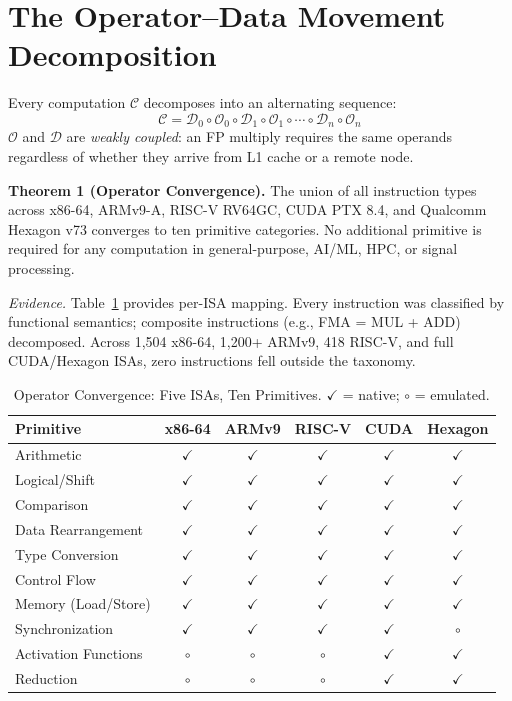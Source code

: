 ﻿\documentclass[review,3p,twocolumn]{elsarticle}
\begin{document}
\section{The Operator--Data Movement Decomposition}
\label{sec:decomp}

Every computation $\mathcal{C}$ decomposes into an alternating sequence:
\begin{equation}
\mathcal{C} = \mathcal{D}_0 \circ \mathcal{O}_0 \circ \mathcal{D}_1 \circ \mathcal{O}_1 \circ \cdots \circ \mathcal{D}_n \circ \mathcal{O}_n
\label{eq:decomp}
\end{equation}
$\mathcal{O}$ and $\mathcal{D}$ are \emph{weakly coupled}: an FP multiply requires the same operands regardless of whether they arrive from L1 cache or a remote node.

\textbf{Theorem 1 (Operator Convergence).} The union of all instruction types across x86-64, ARMv9-A, RISC-V RV64GC, CUDA PTX 8.4, and Qualcomm Hexagon v73 converges to ten primitive categories. No additional primitive is required for any computation in general-purpose, AI/ML, HPC, or signal processing.

\textit{Evidence.} Table~\ref{tab:ops} provides per-ISA mapping. Every instruction was classified by functional semantics; composite instructions (e.g., FMA = MUL + ADD) decomposed. Across 1,504 x86-64, 1,200+ ARMv9, 418 RISC-V, and full CUDA/Hexagon ISAs, zero instructions fell outside the taxonomy.

\begin{table}[h]
\centering
\caption{Operator Convergence: Five ISAs, Ten Primitives. $\checkmark$ = native; $\circ$ = emulated.}
\label{tab:ops}
\begin{tabular}{lccccc}
\toprule
\textbf{Primitive} & \textbf{x86-64} & \textbf{ARMv9} & \textbf{RISC-V} & \textbf{CUDA} & \textbf{Hexagon} \\
\midrule
Arithmetic & $\checkmark$ & $\checkmark$ & $\checkmark$ & $\checkmark$ & $\checkmark$ \\
Logical/Shift & $\checkmark$ & $\checkmark$ & $\checkmark$ & $\checkmark$ & $\checkmark$ \\
Comparison & $\checkmark$ & $\checkmark$ & $\checkmark$ & $\checkmark$ & $\checkmark$ \\
Data Rearrangement & $\checkmark$ & $\checkmark$ & $\checkmark$ & $\checkmark$ & $\checkmark$ \\
Type Conversion & $\checkmark$ & $\checkmark$ & $\checkmark$ & $\checkmark$ & $\checkmark$ \\
Control Flow & $\checkmark$ & $\checkmark$ & $\checkmark$ & $\checkmark$ & $\checkmark$ \\
Memory (Load/Store) & $\checkmark$ & $\checkmark$ & $\checkmark$ & $\checkmark$ & $\checkmark$ \\
Synchronization & $\checkmark$ & $\checkmark$ & $\checkmark$ & $\checkmark$ & $\circ$ \\
Activation Functions & $\circ$ & $\circ$ & $\circ$ & $\checkmark$ & $\checkmark$ \\
Reduction & $\circ$ & $\circ$ & $\circ$ & $\checkmark$ & $\checkmark$ \\
\bottomrule
\end{tabular}
\end{table}
\end{document}
